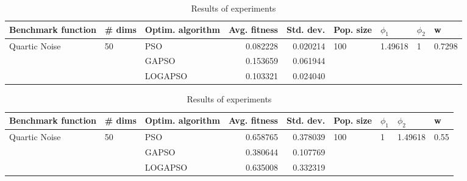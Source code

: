 \documentclass{article}
\begin{document}
\begin{table}
\centering
\caption{Results of experiments}
\begin{tabular}{lllrrllll}
\toprule
            Benchmark function &             \# dims & Optim. algorithm &  Avg. fitness &  Std. dev. &            Pop. size &               $\phi_{1}$ &         $\phi_{2}$ &                       w \\
\midrule
\multirow{3}{*}{Quartic Noise} & \multirow{3}{*}{50} &              PSO &      0.082228 &   0.020214 & \multirow{3}{*}{100} & \multirow{3}{*}{1.49618} & \multirow{3}{*}{1} & \multirow{3}{*}{0.7298} \\
                               &                     &            GAPSO &      0.153659 &   0.061944 &                      &                          &                    &                         \\
                               &                     &          LOGAPSO &      0.103321 &   0.024040 &                      &                          &                    &                         \\
\bottomrule
\end{tabular}
\end{table}
\begin{table}
\centering
\caption{Results of experiments}
\begin{tabular}{lllrrllll}
\toprule
            Benchmark function &             \# dims & Optim. algorithm &  Avg. fitness &  Std. dev. &            Pop. size &         $\phi_{1}$ &               $\phi_{2}$ &                     w \\
\midrule
\multirow{3}{*}{Quartic Noise} & \multirow{3}{*}{50} &              PSO &      0.658765 &   0.378039 & \multirow{3}{*}{100} & \multirow{3}{*}{1} & \multirow{3}{*}{1.49618} & \multirow{3}{*}{0.55} \\
                               &                     &            GAPSO &      0.380644 &   0.107769 &                      &                    &                          &                       \\
                               &                     &          LOGAPSO &      0.635008 &   0.332319 &                      &                    &                          &                       \\
\bottomrule
\end{tabular}
\end{table}
\end{document}
